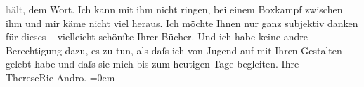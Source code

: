                         \textcolor{gray}{hält}, dem Wort. Ich kann mit ihm nicht ringen, bei einem
                    Boxkampf zwischen ihm und mir käme nicht viel heraus. Ich möchte Ihnen nur ganz
                    subjektiv danken für dieses – vielleicht schönſte Ihrer Bücher. Und ich habe
                    keine andre Berechtigung dazu, es zu tun, als daſs ich von Jugend auf mit Ihren
                    Gestalten gelebt habe und daſs sie mich bis zum heutigen Tage begleiten.\pend
           \pstart
           Ihre{\\[\baselineskip]}\spacefill\mbox{ThereseRie-Andro.}\pend
           \leftskip=0em{}\endnumbering{}  
      